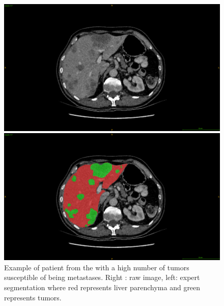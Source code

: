 \begin{figure}[!ht]
	\centering
	\begin{minipage}{0.45\linewidth}
		\includegraphics[width=\linewidth]{../Contributions/images/ResizeLITS_examplePatientMeta}
	\end{minipage} \hspace{-0.1cm}
	\begin{minipage}{0.45\linewidth}
		\includegraphics[width=\linewidth]{../Contributions/images/ResizeLITS_examplePatientMeta_seg}
	\end{minipage}
	\caption{Example of patient from the \textbf{} with a high number of tumors susceptible of being metastases. Right : raw image, left: expert segmentation where red represents liver parenchyma and green represents tumors.}
	\label{fig:litsDb_meta}
\end{figure}
